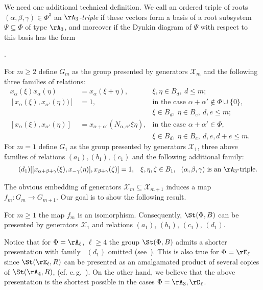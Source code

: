 We need one additional technical definition. We call an ordered triple of roots $(\alpha, \beta, \gamma) \in \Phi^3$ an {\it $\rA_3$-triple}
 if these vectors form a basis of a root subsystem $\Psi \subseteq \Phi$ of type $\rA_3$, and moreover if the Dynkin diagram of $\Psi$ with respect to this basis has the form
.
  
For $m\geq 2$ define $G_m$ as the group presented by generators $\mathcal{X}_m$ and the following three families of relations:
\begin{align}
 \label{eq:am} \tag{$a_m$} x_{\alpha}(\xi) x_{\alpha}(\eta) & = x_{\alpha}(\xi+\eta),&  \xi,\eta\in B_d,\ d\leq m;&\\
 \label{eq:bm} \tag{$b_m$} [x_\alpha(\xi), x_{\alpha'}(\eta))] &  = 1, & \text{in the case $\alpha+\alpha'\not\in\Phi\cup\{0\}$,}\\
 \nonumber                                                     &       & \xi \in B_d,\ \eta \in B_e,\ d,e\leq m;\\
 \label{eq:cm} \tag{$c_m$} [x_\alpha(\xi), x_{\alpha'}(\eta)] & = x_{\alpha+\alpha'}(N_{\alpha,\alpha'}\xi\eta), & \text{in the case $\alpha+\alpha'\in \Phi$,}\\
 \nonumber                                                    &  & \xi \in B_d,\ \eta \in B_e,\ d, e, d+e \leq m.
 \end{align}
For $m=1$ define $G_1$ as the group presented by generators $\mathcal{X}_1$, 
three above families of relations $(a_1), (b_1), (c_1)$ and the following additional family:
\begin{align}  \label{eq:d1} \tag{$d_1$} [[x_{\alpha+\beta+\gamma}(\xi), x_{-\gamma}(\eta)], x_{\beta+\gamma}(\zeta) ] & = 1, 
 & \xi,\eta,\zeta\in B_1,\ \text{ $(\alpha, \beta, \gamma)$ is an $\rA_3$-triple. }
\end{align}

The obvious embedding of generators $\mathcal{X}_m \subseteq \mathcal{X}_{m+1}$ induces a map $f_m\colon G_m \to G_{m+1}$.
Our goal is to show the following result.
\begin{prop}\label{prop:tul3.3}
 For $m\geq 1$ the map $f_m$ is an isomorphism. Consequently, $\St(\Phi, B)$ can be presented by generators $\mathcal{X}_1$ and relations $(a_1)$, $(b_1)$, $(c_1)$, $(d_1)$.
\end{prop}
\begin{rem}
   Notice that for $\Phi=\rA_\ell$, $\ell\geq 4$ the group $\St(\Phi, B)$ admits a shorter presentation with family~ $(d_1)$ omitted (see~\cite[Lemma~3.3]{Tu83}).
   This is also true for $\Phi=\rE_\ell$ since $\St(\rE_\ell, R)$ can be presented as an amalgamated product of several copies of $\St(\rA_4, R)$, (cf. e.\,g.~\cite[Lemmas~3,7)]{S15}).   
  On the other hand, we believe that the above presentation is the shortest possible in the cases $\Phi=\rA_3, \rD_\ell$. \end{rem}

